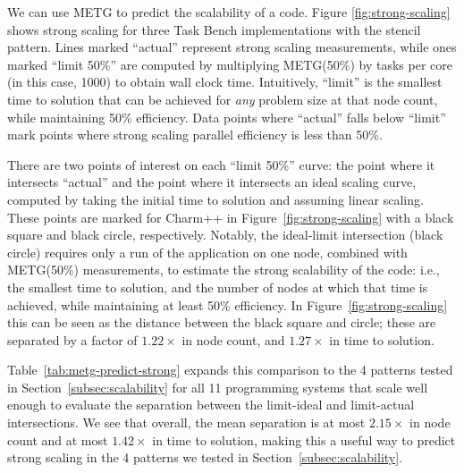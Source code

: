 We can use METG to predict the scalability of a code. Figure
\ref{fig:strong-scaling} shows strong scaling for three Task Bench
implementations with the stencil pattern. Lines marked ``actual''
represent strong scaling measurements, while ones marked ``limit 50\%'' are
computed by multiplying METG(50\%) by tasks per core (in this case,
1000) to obtain wall clock time. Intuitively, ``limit'' is the smallest time to solution that
can be achieved for \emph{any} problem size at that node count, while
maintaining 50\% efficiency. Data points where ``actual'' falls below
``limit'' mark points where strong scaling parallel efficiency is less
than 50\%.

There are two points of interest on each ``limit 50\%'' curve: the point
where it intersects ``actual'' and the point where it intersects an
ideal scaling curve, computed by taking the initial time to solution
and assuming linear scaling. These points are marked for Charm++ in
Figure~\ref{fig:strong-scaling} with a black square and black circle,
respectively.
Notably, the ideal-limit intersection (black circle) requires only a
run of the application on one node, combined with METG(50\%)
measurements, to estimate the strong scalability of
the code:
i.e., the smallest time to solution,
and the number of nodes at which that time is achieved, while
maintaining at least 50\% efficiency. In
Figure~\ref{fig:strong-scaling} this can be seen as the distance
between the black square and circle; these are separated by a factor of
$1.22\times$ in node count, and $1.27\times$ in time to solution.

Table~\ref{tab:metg-predict-strong} expands this comparison to the 4
patterns tested in Section~\ref{subsec:scalability} for all 11
programming systems that scale well enough to evaluate the separation
between the limit-ideal and limit-actual intersections. We see that
overall, the mean separation is at most $2.15\times$ in node count
and at most $1.42\times$ in time to solution, making this a
useful way to predict strong scaling in the 4 patterns we tested in
Section~\ref{subsec:scalability}.


